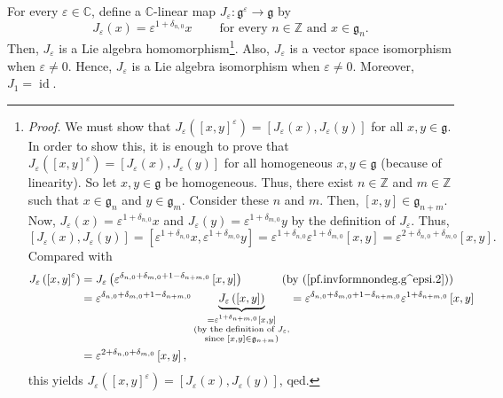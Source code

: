 \documentclass[etingof-lie.tex]{subfiles}
\begin{document}
For every $\varepsilon\in\mathbb{C}$, define a $\mathbb{C}$-linear map
$J_{\varepsilon}:\mathfrak{g}^{\varepsilon}\rightarrow\mathfrak{g}$ by%
\[
J_{\varepsilon}\left(  x\right)  =\varepsilon^{1+\delta_{n,0}}%
x\ \ \ \ \ \ \ \ \ \ \text{for every }n\in\mathbb{Z}\text{ and }%
x\in\mathfrak{g}_{n}.
\]
Then, $J_{\varepsilon}$ is a Lie algebra homomorphism\footnote{\textit{Proof.}
We must show that $J_{\varepsilon}\left(  \left[  x,y\right]  ^{\varepsilon
}\right)  =\left[  J_{\varepsilon}\left(  x\right)  ,J_{\varepsilon}\left(
y\right)  \right]  $ for all $x,y\in\mathfrak{g}$. In order to show this, it
is enough to prove that $J_{\varepsilon}\left(  \left[  x,y\right]
^{\varepsilon}\right)  =\left[  J_{\varepsilon}\left(  x\right)
,J_{\varepsilon}\left(  y\right)  \right]  $ for all homogeneous
$x,y\in\mathfrak{g}$ (because of linearity). So let $x,y\in\mathfrak{g}$ be
homogeneous. Thus, there exist $n\in\mathbb{Z}$ and $m\in\mathbb{Z}$ such that
$x\in\mathfrak{g}_{n}$ and $y\in\mathfrak{g}_{m}$. Consider these $n$ and $m$.
Then, $\left[  x,y\right]  \in\mathfrak{g}_{n+m}$. Now, $J_{\varepsilon
}\left(  x\right)  =\varepsilon^{1+\delta_{n,0}}x$ and $J_{\varepsilon}\left(
y\right)  =\varepsilon^{1+\delta_{m,0}}y$ by the definition of $J_{\varepsilon
}$. Thus,%
\[
\left[  J_{\varepsilon}\left(  x\right)  ,J_{\varepsilon}\left(  y\right)
\right]  =\left[  \varepsilon^{1+\delta_{n,0}}x,\varepsilon^{1+\delta_{m,0}%
}y\right]  =\varepsilon^{1+\delta_{n,0}}\varepsilon^{1+\delta_{m,0}}\left[
x,y\right]  =\varepsilon^{2+\delta_{n,0}+\delta_{m,0}}\left[  x,y\right]  .
\]
Compared with%
\begin{align*}
J_{\varepsilon}\left(  \left[  x,y\right]  ^{\varepsilon}\right)   &
=J_{\varepsilon}\left(  \varepsilon^{\delta_{n,0}+\delta_{m,0}+1-\delta
_{n+m,0}}\left[  x,y\right]  \right)  \ \ \ \ \ \ \ \ \ \ \left(  \text{by
(\ref{pf.invformnondeg.g^epsi.2})}\right) \\
&  =\varepsilon^{\delta_{n,0}+\delta_{m,0}+1-\delta_{n+m,0}}%
\underbrace{J_{\varepsilon}\left(  \left[  x,y\right]  \right)  }%
_{\substack{=\varepsilon^{1+\delta_{n+m,0}}\left[  x,y\right]  \\\text{(by the
definition of }J_{\varepsilon}\text{,}\\\text{since }\left[  x,y\right]
\in\mathfrak{g}_{n+m}\text{)}}}=\varepsilon^{\delta_{n,0}+\delta
_{m,0}+1-\delta_{n+m,0}}\varepsilon^{1+\delta_{n+m,0}}\left[  x,y\right] \\
&  =\varepsilon^{2+\delta_{n,0}+\delta_{m,0}}\left[  x,y\right]  ,
\end{align*}
this yields $J_{\varepsilon}\left(  \left[  x,y\right]  ^{\varepsilon}\right)
=\left[  J_{\varepsilon}\left(  x\right)  ,J_{\varepsilon}\left(  y\right)
\right]  $, qed.}. Also, $J_{\varepsilon}$ is a vector space isomorphism when
$\varepsilon\neq0$. Hence, $J_{\varepsilon}$ is a Lie algebra isomorphism when
$\varepsilon\neq0$. Moreover, $J_{1}=\operatorname*{id}$.
\end{document}
